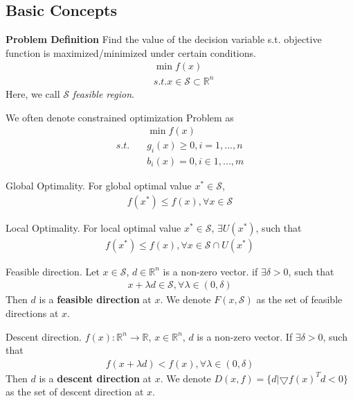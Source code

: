 \documentclass[runningheads]{llncs}
\begin{document}
\subsection{Basic Concepts}
\noindent\textbf{Problem Definition}
Find the value of the decision variable s.t.
objective function is maximized/minimized
under certain conditions.
\begin{align}
    & \min f(x) \\
    & s.t. x \in \mathcal{S} \subset \mathbb{R}^n
\end{align}
Here, we call $\mathcal{S}$ \textit{feasible region}.
\par
We often denote constrained optimization Problem
 as 
\begin{align}
    & \min f(x) \\
    s.t.\quad & g_i(x) \geq 0, i = 1,..., n \\
    & b_i(x) = 0, i \in 1, ..., m
\end{align}

\begin{definition}{Global Optimality.}
    For global optimal value $x^* \in \mathcal{S}$,
    \begin{align}
        f(x^*) \leq f(x), \forall x \in \mathcal{S}
    \end{align}
\end{definition}

\begin{definition}{Local Optimality.}
    For local optimal value $x^* \in \mathcal{S}$, $\exists U(x^*)$,
    such that
    \begin{align}
        f(x^*) \leq f(x), \forall x \in \mathcal{S} \cap U(x^*)
    \end{align}
    \end{definition}

\begin{definition}{Feasible direction.}
    Let $x \in \mathcal{S}$, $d \in \mathbb{R}^n$
    is a non-zero vector. if $\exists \delta > 0$,
    such that
    \begin{align}
        x + \lambda d \in \mathcal{S}, \forall \lambda \in (0, \delta)
    \end{align}
    Then $d$ is a \textbf{feasible direction} at $x$.
    We denote $F(x, \mathcal{S})$ as the set of feasible directions
    at $x$.
\end{definition}

\begin{definition}{Descent direction.}
    $f(x): \mathbb{R}^n \rightarrow \mathbb{R}$, $x \in \mathbb{R}^n$,
    $d$ is a non-zero vector. If $\exists \delta > 0$, such that
    \begin{align}
        f(x + \lambda d) < f(x), \forall \lambda \in (0, \delta)
    \end{align}
    Then $d$ is a \textbf{descent direction} at $x$.
    We denote $D(x, f) = \{ d | \bigtriangledown f(x)^T d < 0 \}$
    as the set of descent direction at $x$.
\end{definition}
\end{document}
